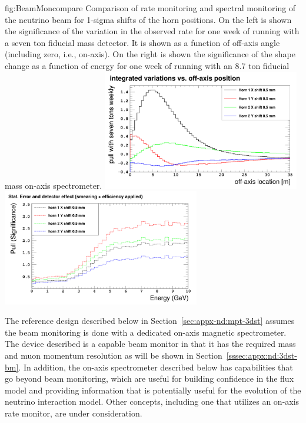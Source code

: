 \begin{dunefigure}{fig:BeamMoncompare}
{Comparison of rate monitoring and spectral monitoring of the neutrino beam for  1-sigma shifts of the horn positions.  On the left is shown the significance of the variation in the observed rate for one week of running with a seven ton fiducial mass detector.  It is shown as a function of off-axis angle (including zero, i.e., on-axis). On the right is shown the significance of the shape change as a function of energy for one week of running with an 8.7 ton fiducial mass on-axis spectrometer.}
  \includegraphics[width=3.4in]{graphics/beamSpec1.png}
    \includegraphics[width=3.4in]{graphics/beamSpec6.png}
\end{dunefigure}

The reference design described below in Section~\ref{sec:appx-nd:mpt-3dst} assumes the beam monitoring is done with a dedicated on-axis magnetic spectrometer.  The device described is a capable beam monitor in that it has the required mass and muon momentum resolution as will be shown in Section~\ref{sssec:appx:nd:3dst-bm}.  In addition, the on-axis spectrometer described below has capabilities that go beyond beam monitoring, which are useful for building confidence in the flux model and providing information that is potentially useful for the evolution of the neutrino interaction model.  Other concepts, including one that utilizes an on-axis rate monitor, are under consideration.


